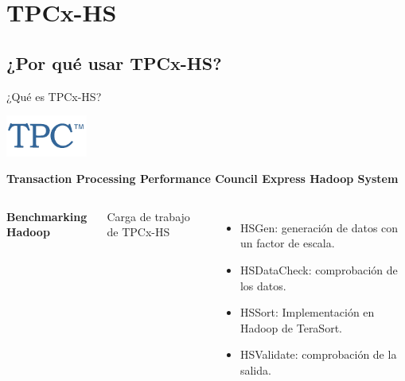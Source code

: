
\section{TPCx-HS}

	\subsection*{¿Por qué usar TPCx-HS?}

		\begin{frame}{¿Qué es TPCx-HS?}
			\kern -10mm
			\begin{flushright}
					\includegraphics[width=0.2\textwidth]{./Images/tpc-logo.png}
			\end{flushright}
			\kern -2mm
			\begin{tcolorbox}[colback=ChetwodeBlue!10,colframe=ChetwodeBlue!60]
				\fontsize{8}{8}\selectfont
				\centering
				\textbf{Transaction Processing Performance Council Express Hadoop System}
			\end{tcolorbox}

			\begin{columns}[c]
					\kern-2mm
					\begin{center}
						{\color{TurkishRose}\large \textbf{Benchmarking Hadoop}}						
					\end{center}
					
					\kern 3mm

					{\color{ChetwodeBlue}\large Carga de trabajo de TPCx-HS}		
					\begin{itemize}
						\fontsize{8}{10}\selectfont
						\item HSGen: generación de datos con un factor de escala.
						\item HSDataCheck: comprobación de los datos.
						\item HSSort: Implementación en Hadoop de TeraSort.
						\item HSValidate: comprobación de la salida.
					\end{itemize}		
			

\end{columns}
\end{frame}
